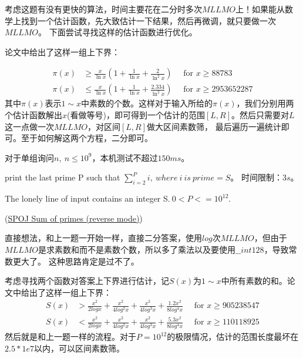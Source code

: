 

\begin{note}
考虑这题有没有更快的算法，时间主要花在二分时多次$MLLMO$上！如果能从数学上找到一个估计函数，先大致估计一下结果，然后再微调，就只要做一次$MLLMO$。
下面尝试寻找这样的估计函数进行优化。
\end{note}

\vbox{}

论文\cite{1002.0442}中给出了这样一组上下界：

$$
\begin{aligned} \pi(x) & \geqslant \frac{x}{\ln x}\left(1+\frac{1}{\ln x}+\frac{2}{\ln ^{2} x}\right) \quad \text { for } x \geqslant 88783 \\ \pi(x) & \leqslant \frac{x}{\ln x}\left(1+\frac{1}{\ln x}+\frac{2.334}{\ln ^{2} x}\right) \quad \text { for } x \geqslant 2953652287 \end{aligned}
$$
其中$\pi(x)$表示$1\sim x$中素数的个数。这样对于输入所给的$\pi(x)$，我们分别用两个估计函数解出$x$(看做等号)，即可得到一个估计的范围$[L,R]$。然后只需要对$L$这一点做一次$MLLMO$，对区间$[L,R]$做大区间素数筛，
最后遍历一遍统计即可。至于如何解这两个方程，二分即可。

对于单组询问$n,\ n\le 10^9$，本机测试不超过$150ms$。





\vbox{}






\begin{example}
	print the last prime P such that $\sum_{i=2}^Pi,\ where\ i \ is\ prime = S$。 时间限制：$3s$。
	
	The lonely line of input contains an integer S.$\ 0 < P <= 10^{12}$.
	
	(\href{https://www.spoj.com/problems/SUMPRIM2/}{SPOJ Sum of primes (reverse mode)})
\end{example}
\begin{solution}
	直接想法，和上一题一开始一样，直接二分答案，使用$log$次$MLLMO$，但由于$MLLMO$是求素数和而不是素数个数，所以多了乘法以及要使用$\_\_int128$，导致常数更大了。
	这种思路肯定是过不了。
	
	考虑寻找两个函数对答案上下界进行估计，记$S(x)$为$1\sim x$中所有素数的和。论文\cite{Axler2014On}中给出了这样一组上下界：
	$$
	\begin{aligned} S(x) & > \frac{x^2}{2logx} + \frac{x^2}{4log^2x} + \frac{x^2}{4log^3x} + \frac{1.2x^2}{8log^4x} \quad \text { for } x \geqslant 905238547 \\ S(x) & < \frac{x^2}{2logx} + \frac{x^2}{4log^2x} + \frac{x^2}{4log^3x} + \frac{5.3x^2}{8log^4x} \quad \text { for } x \geqslant 110118925 \end{aligned}
	$$
	然后就是和上一题一样的流程。对于$P=10^{12}$的极限情况，估计的范围长度最坏在$2.5*1e7$以内，可以区间素数筛。
	
	
\end{solution}

